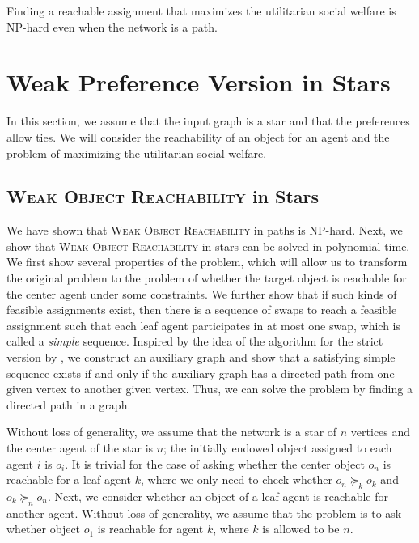 \begin{theorem}
  \label{the_sw}
    Finding a reachable assignment that maximizes the utilitarian social welfare is NP-hard even when the network is a path.
\end{theorem}



\section{Weak Preference Version in Stars}\label{sec-star}
In this section, we assume that the input graph is a star and that the preferences allow ties.
We will consider the reachability of an object for an agent and the problem of maximizing the utilitarian social welfare.

\subsection{\textsc{Weak Object Reachability} in Stars}
We have shown that \textsc{Weak Object Reachability} in paths is NP-hard.
Next, we show that  \textsc{Weak Object Reachability} in stars can be solved in polynomial time.
We first show several properties of the problem, which will allow us to transform the original problem to the problem of whether the target object is reachable for the center agent under some constraints. We further show that if such kinds of feasible assignments exist, then there is a sequence of swaps to reach a feasible assignment such that each leaf agent participates in at most one swap, which is called a \emph{simple} sequence. Inspired by the idea of the algorithm for the strict version by \citet{DBLP:conf/ijcai/GourvesLW17},
we construct an auxiliary graph and show that a satisfying simple sequence exists if and only if the auxiliary graph has a directed path from one given vertex to another given vertex. Thus,
we can solve the problem by finding a directed path in a graph.

Without loss of generality, we assume that the network is a star of $n$ vertices and the center agent of the star is $n$;
the initially endowed object assigned to each agent $i$ is $o_i$.
It is trivial for the case of asking whether the center object $o_n$ is reachable for a leaf agent $k$, where we only need to check whether $o_n \succeq_k o_k $ and $o_k \succeq_n o_n$.
Next, we consider whether an object of a leaf agent is reachable for another agent.
Without loss of generality, we assume that the problem is to ask whether object $o_1$ is reachable for agent $k$, where $k$ is allowed to be $n$.


